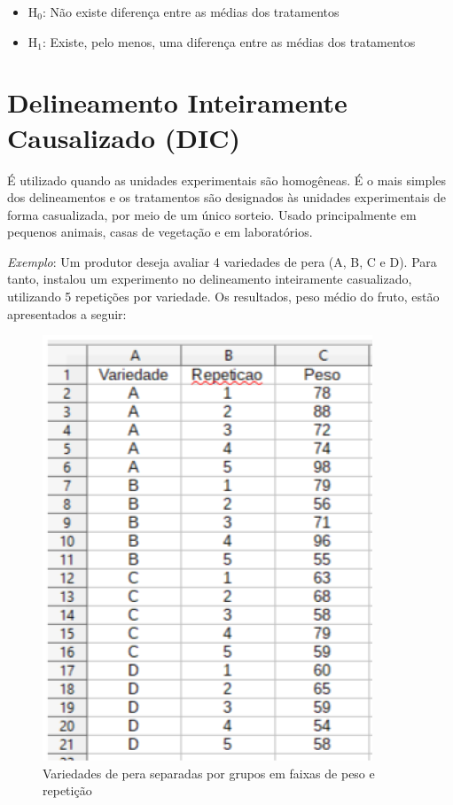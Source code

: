\documentclass[12pt,brazil,oneside]{book}
\begin{document}
\begin{itemize}
\item
  H\(_0\): Não existe diferença entre as médias dos tratamentos
\item
  H\(_1\): Existe, pelo menos, uma diferença entre as médias dos tratamentos
\end{itemize}

\hypertarget{delineamento-inteiramente-causalizado-dic}{%
\section{Delineamento Inteiramente Causalizado (DIC)}\label{delineamento-inteiramente-causalizado-dic}}

É utilizado quando as unidades experimentais são homogêneas. É o mais simples dos delineamentos e os tratamentos são designados às unidades experimentais de forma casualizada, por meio de um único sorteio. Usado principalmente em pequenos animais, casas de vegetação e em
laboratórios.

\emph{Exemplo}: Um produtor deseja avaliar 4 variedades de pera (A, B, C e D). Para tanto, instalou um experimento no delineamento inteiramente casualizado, utilizando 5 repetições por variedade. Os resultados, peso médio do fruto, estão apresentados a seguir:

\begin{figure}[H]

{\centering \includegraphics[width=0.8\linewidth]{delimexp0} 

}

\caption{Variedades de pera separadas por grupos em faixas de peso e repetição}\label{fig:unnamed-chunk-2}
\end{figure}
\end{document}
